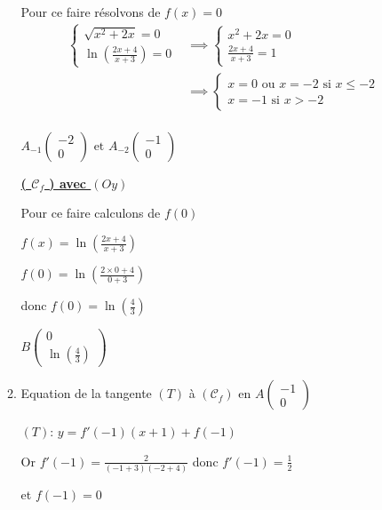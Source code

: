 \documentclass[12pt,a4paper]{article}
\begin{document}
\begin{enumerate}
\begin{enumerate}
    Pour ce faire résolvons de $f(x)=0$
\[
\begin{aligned}
    \begin{cases}
    \sqrt{x^2 + 2x} = 0 \\
    \ln\left( \frac{2x+4}{x+3} \right) = 0
\end{cases} &\implies
\begin{cases}
    x^2 + 2x = 0 \\
    \frac{2x+4}{x+3} = 1
\end{cases}\\
 &\implies
\begin{cases}
    x= 0 \text{ ou } x = -2 \text{ si } x \leq -2\\
    x=-1 \text{ si } x > -2
\end{cases}\\
\end{aligned}
\]

\( A_{-1} \begin{pmatrix} -2 \\ 0 \end{pmatrix} \text{ et } A_{-2} \begin{pmatrix} -1 \\ 0 \end{pmatrix} \) 

\underline{ \textbf{ ( \( \mathcal{C}_{f} \) ) avec \( (Oy) \) } }

    Pour ce faire calculons de $f(0)$

    \( f(x) = \ln\left( \frac{2x+4}{x+3} \right) \)
    
    \( f(0) = \ln\left( \frac{2 \times 0+4}{0+3} \right) \)

donc \( f(0) = \ln\left( \frac{4}{3} \right) \)

$ B \begin{pmatrix} 0 \\ \ln\left( \frac{4}{3} \right) \end{pmatrix} $

\item Equation de la tangente \( (T) \) à \( (\mathcal{C}_{f}) \) en \( A\begin{pmatrix} -1 \\ 0 \end{pmatrix} \)

\( (T) \): \( y = f'(-1) (x+1)  + f(-1) \)

Or \( f'(-1) = \frac{2}{(-1+3)(-2+4)} \) donc \( f'(-1) = \frac{1}{2} \)

et \( f(-1) = 0 \)


\end{enumerate}
\end{enumerate}
\end{document}
